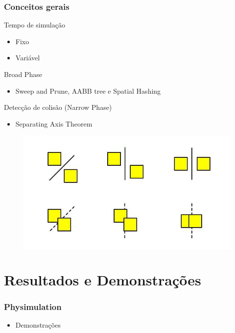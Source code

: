 \documentclass{beamer}
\begin{document}
\begin{frame}
  \frametitle{Conceitos gerais}
  \begin{block}{Tempo de simulação}
    \begin{itemize}
      \item Fixo
      \item Variável
    \end{itemize}
  \end{block}
  \begin{block}{Broad Phase}
    \begin{itemize}
      \item Sweep and Prune, AABB tree e Spatial Hashing
    \end{itemize}
  \end{block}
  \begin{block}{Detecção de colisão (Narrow Phase)}
    \begin{itemize}
      \item Separating Axis Theorem
    \end{itemize}
  \end{block}
  \begin{figure}
    \includegraphics[scale=0.2]{SAT.jpg}
  \end{figure}
\end{frame}
\section{Resultados e Demonstrações} 

\begin{frame}
  \frametitle{Physimulation}
  \begin{itemize}
    \item Demonstrações 
  \end{itemize} 
\end{frame}
\end{document}
